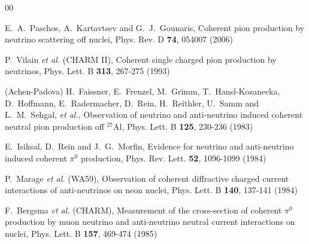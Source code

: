 \documentclass[aps,prl,twocolumn,superscriptaddress,nofootinbib]{revtex4-1}
\begin{document}
\begin{thebibliography}{00}

E.~A.~Paschos, A.~Kartavtsev and G.~J.~Gounaris,
Coherent pion production by neutrino scattering off nuclei,
Phys. Rev. D \textbf{74}, 054007 (2006)

P.~Vilain \textit{et al.} (CHARM II),
Coherent single charged pion production by neutrinos,
Phys. Lett. B \textbf{313}, 267-275 (1993)

 (Achen-Padova)
H.~Faissner, E.~Frenzel, M.~Grimm, T.~Hansl-Kozanecka, D.~Hoffmann, E.~Radermacher, D.~Rein, H.~Reithler, U.~Samm and L.~M.~Sehgal, \textit{et al.},
Observation of neutrino and anti-neutrino induced coherent neutral pion production off $^{27}$Al,
Phys. Lett. B \textbf{125}, 230-236 (1983)

E.~Isiksal, D.~Rein and J.~G.~Morfin,
Evidence for neutrino and anti-neutrino induced coherent $\pi^{0}$ production,
Phys. Rev. Lett. \textbf{52}, 1096-1099 (1984)

P.~Marage \textit{et al.} (WA59),
Observation of coherent diffractive charged current interactions of anti-neutrinos on neon nuclei,
Phys. Lett. B \textbf{140}, 137-141 (1984)

F.~Bergsma \textit{et al.} (CHARM),
Measurement of the cross-section of coherent $\pi^0$ production by muon neutrino and anti-neutrino neutral current interactions on nuclei,
Phys. Lett. B \textbf{157}, 469-474 (1985)


\end{thebibliography}
\end{document}
